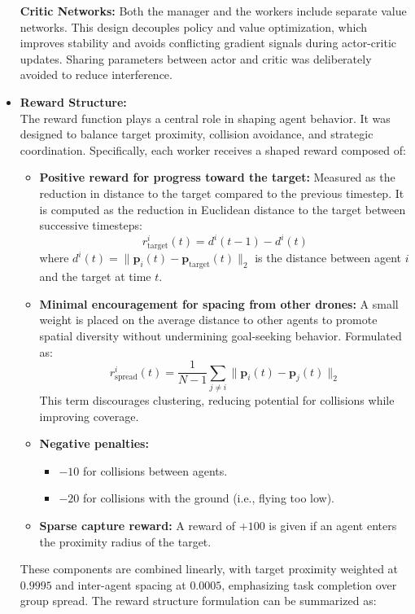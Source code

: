 \documentclass[12pt,a4paper,twoside,openany]{book}
\begin{document}
\begin{itemize}
\textbf{Critic Networks:} Both the manager and the workers include separate value networks. This design decouples policy and value optimization, which improves stability and avoids conflicting gradient signals during actor-critic updates. Sharing parameters between actor and critic was deliberately avoided to reduce interference.

\item \textbf{Reward Structure:} \\
The reward function plays a central role in shaping agent behavior. It was designed to balance target proximity, collision avoidance, and strategic coordination. Specifically, each worker receives a shaped reward composed of:

\begin{itemize}
    \item \textbf{Positive reward for progress toward the target:} Measured as the reduction in distance to the target compared to the previous timestep. It is computed as the reduction in Euclidean distance to the target between successive timesteps:
    \[
    r_{\text{target}}^i(t) = d^i(t-1) - d^i(t)
    \]
    where \( d^i(t) = \| \mathbf{p}_i(t) - \mathbf{p}_{\text{target}}(t) \|_2 \) is the distance between agent \( i \) and the target at time \( t \).

    \item \textbf{Minimal encouragement for spacing from other drones:} A small weight is placed on the average distance to other agents to promote spatial diversity      without undermining goal-seeking behavior. Formulated as:
    \[
     r_{\text{spread}}^i(t) = \frac{1}{N - 1} \sum_{j \neq i} \| \mathbf{p}_i(t) - \mathbf{p}_j(t) \|_2
    \]
    This term discourages clustering, reducing potential for collisions while improving coverage.


    \item \textbf{Negative penalties:} 
    \begin{itemize}
        \item $-10$ for collisions between agents.
        \item $-20$ for collisions with the ground (i.e., flying too low).
    \end{itemize}
    \item \textbf{Sparse capture reward:} A reward of $+100$ is given if an agent enters the proximity radius of the target.
\end{itemize}

These components are combined linearly, with target proximity weighted at $0.9995$ and inter-agent spacing at $0.0005$, emphasizing task completion over group spread. The reward structure formulation can be summarized as:


\end{itemize}
\end{document}

